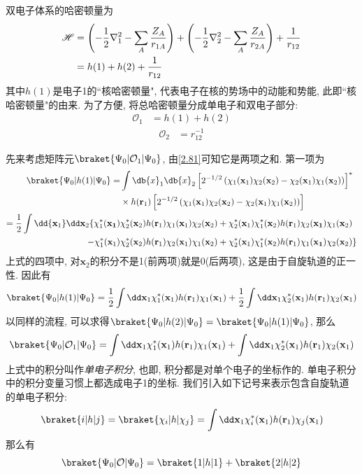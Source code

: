 双电子体系的哈密顿量为
\begin{align}
\mathscr{H}&=\left( -\frac{1}{2}\nabla_1^2 - \sum_A\frac{Z_A}{r_{1A}} \right) + \left( -\frac{1}{2}\nabla_2^2 - \sum_A\frac{Z_A}{r_{2A}} \right) + \frac{1}{r_{12}}\notag\\
&=h(1) + h(2) + \frac{1}{r_{12}}
\end{align}
其中$h(1)$是电子1的``核哈密顿量", 
代表电子在核的势场中的动能和势能, 
此即``核哈密顿量"的由来. 
为了方便, 
将总哈密顿量分成单电子和双电子部分:
\begin{align}
\mathcal{O}_1&=h(1)+h(2)
\label{2.81}
\end{align}
\begin{align}
\mathcal{O}_2&=r_{12}^{-1}
\end{align}

先来考虑矩阵元$\braket{\Psi_0|\mathcal{O}_1|\Psi_0}$, 
由\autoref{2.81}可知它是两项之和. 
第一项为
\begin{align}
\braket{\Psi_0|h(1)|\Psi_0}=&\int\db{x}_1\db{x}_2\left[2^{-1/2}\left(\chi_1(\mathbf{x}_1)\chi_2(\mathbf{x}_2)-\chi_2(\mathbf{x}_1)\chi_1(\mathbf{x}_2)\right)\right]^*\notag\\
\qquad&\times h(\mathbf{r}_1)\left[ 2^{-1/2}\left(\chi_1(\mathbf{x}_1)\chi_2(\mathbf{x}_2)-\chi_2(\mathbf{x}_1)\chi_1(\mathbf{x}_2)\right)\right]\notag\\
=\frac{1}{2}\int\dd{\mathbf{x}_1}\dd\mathbf{x}_2\{\chi_1^*(\mathbf{x_1})&\chi_2^*(\mathbf{x}_2)h(\mathbf{r}_1)\chi_1(\mathbf{x}_1)\chi_2(\mathbf{x}_2) + \chi_2^*(\mathbf{x}_1)\chi_1^*(\mathbf{x}_2)h(\mathbf{r}_1)\chi_2(\mathbf{x_1})\chi_1(\mathbf{x}_2) \notag\\
 - \chi_1^*(\mathbf{x}_1)&\chi_2^*(\mathbf{x}_2)h(\mathbf{r}_1)\chi_2(\mathbf{x}_1)\chi_1(\mathbf{x}_2) + \chi_2^*(\mathbf{x}_1)\chi_1^*(\mathbf{x}_2)h(\mathbf{r}_1)\chi_1(\mathbf{x_1})\chi_2(\mathbf{x}_2)
\}
\end{align}
上式的四项中, 
对$\mathbf{x}_2$的积分不是1(前两项)就是0(后两项), 
这是由于自旋轨道的正一性. 
因此有
\begin{equation}
\braket{\Psi_0|h(1)|\Psi_0}=\frac{1}{2}\int\dd\mathbf{x}_1\chi_1^*(\mathbf{x}_1)h(\mathbf{r}_1)\chi_1(\mathbf{x}_1)+\frac{1}{2}\int\dd\mathbf{x}_1\chi_2^*(\mathbf{x}_1)h(\mathbf{r}_1)\chi_2(\mathbf{x}_1)
\end{equation}
以同样的流程, 
可以求得$\braket{\Psi_0|h(2)|\Psi_0}=\braket{\Psi_0|h(1)|\Psi_0}$, 
那么
\begin{equation}
\braket{\Psi_0|\mathcal{O}_1|\Psi_0}=\int\dd\mathbf{x}_1\chi_1^*(\mathbf{x}_1)h(\mathbf{r}_1)\chi_1(\mathbf{x}_1) + \int\dd\mathbf{x}_1\chi_2^*(\mathbf{x}_1)h(\mathbf{r}_1)\chi_2(\mathbf{x}_1)
\end{equation}
上式中的积分叫作\emph{单电子积分}, 
也即, 
积分都是对单个电子的坐标作的. 
单电子积分中的积分变量习惯上都选成电子1的坐标. 
我们引入如下记号来表示包含自旋轨道的单电子积分:
\begin{equation}
\braket{i|h|j}=\braket{\chi_i|h|\chi_j}=\int\dd\mathbf{x}_1\chi_i^*(\mathbf{x}_1)h(\mathbf{r}_1)\chi_j(\mathbf{x}_1)
\end{equation}
那么有
\begin{equation}
\braket{\Psi_0|\mathcal{O}|\Psi_0}=\braket{1|h|1}+\braket{2|h|2}
\end{equation}

